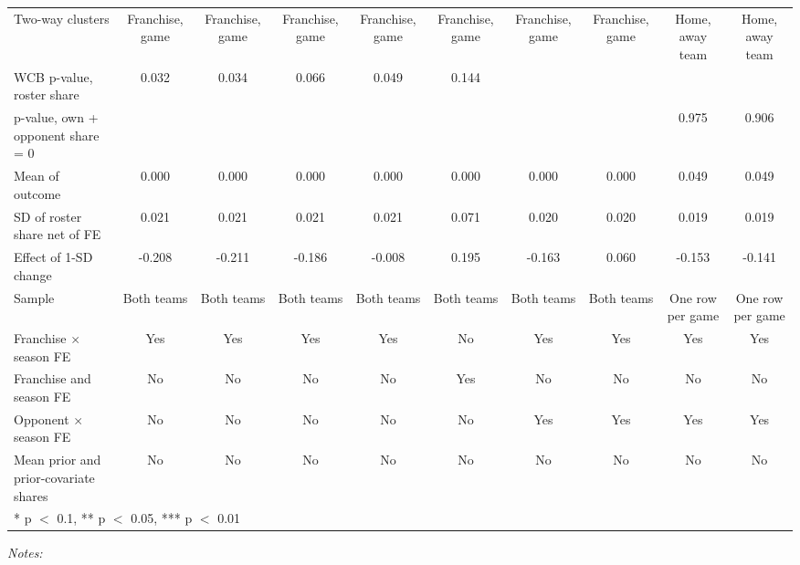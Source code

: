 \begin{table}[!h]
{\begin{threeparttable}
\begin{tabular}[t]{lccccccccc}
Two-way clusters & Franchise, game & Franchise, game & Franchise, game & Franchise, game & Franchise, game & Franchise, game & Franchise, game & Home, away team & Home, away team\\
WCB p-value, roster share & 0.032 & 0.034 & 0.066 & 0.049 & 0.144 &  &  &  & \\
p-value, own + opponent share = 0 &  &  &  &  &  &  &  & 0.975 & 0.906\\
Mean of outcome & 0.000 & 0.000 & 0.000 & 0.000 & 0.000 & 0.000 & 0.000 & 0.049 & 0.049\\
SD of roster share net of FE & 0.021 & 0.021 & 0.021 & 0.021 & 0.071 & 0.020 & 0.020 & 0.019 & 0.019\\
Effect of 1-SD change & -0.208 & -0.211 & -0.186 & -0.008 & 0.195 & -0.163 & 0.060 & -0.153 & -0.141\\
Sample & Both teams & Both teams & Both teams & Both teams & Both teams & Both teams & Both teams & One row per game & One row per game\\
Franchise $\times$ season FE & Yes & Yes & Yes & Yes & No & Yes & Yes & Yes & Yes\\
Franchise and season FE & No & No & No & No & Yes & No & No & No & No\\
Opponent $\times$ season FE & No & No & No & No & No & Yes & Yes & Yes & Yes\\
Mean prior and prior-covariate shares & No & No & No & No & No & No & No & No & No\\
\bottomrule
\multicolumn{10}{l}{\rule{0pt}{1em}* p $<$ 0.1, ** p $<$ 0.05, *** p $<$ 0.01}\\
\end{tabular}
\begin{tablenotes}[para]
\item \textit{Notes:} 

\end{tablenotes}
\end{threeparttable}}
\end{table}

